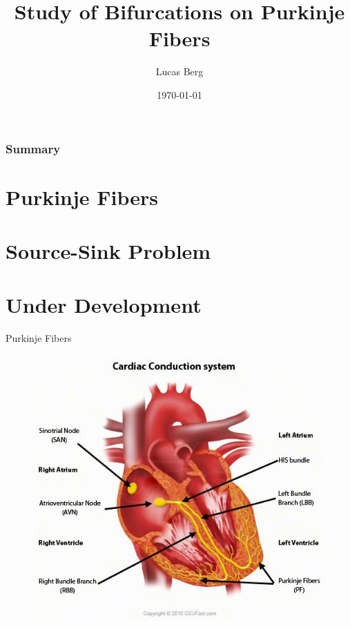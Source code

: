 \documentclass[unknownkeysallowed]{beamer}
\title{Study of Bifurcations on Purkinje Fibers}
\author{Lucas Berg}
\date{\today}
\begin{document}
    \maketitle
    
    \begin{frame}
	  \frametitle{Summary}
	  \section{Purkinje Fibers}
	  \section{Source-Sink Problem}
	  \section{Under Development}
    \end{frame}
    
    \begin{frame}{Purkinje Fibers}
	      \begin{figure}
		      \centering
		      \includegraphics[scale=0.5]{img/cardiac-conduction-system.jpg}
	      \end{figure}
    \end{frame}
    
\end{document}
